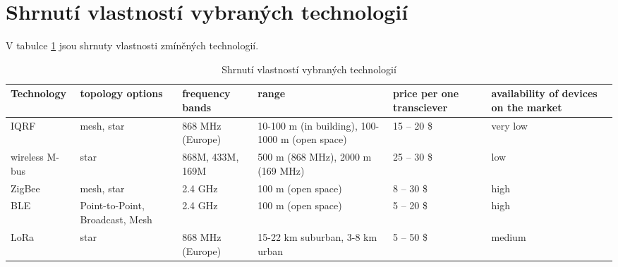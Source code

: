 

\section{Shrnutí vlastností vybraných technologií}
V tabulce \ref{tab:shrnutiTechnologii} jsou shrnuty vlastnosti zmíněných technologií.   


\begin{table}[]
  \begin{tabular}{|p{1.5cm}||p{2cm}|p{2cm}|p{2cm}|p{2cm}|p{2cm}|}
  \hline
  Technology    & topology options                & frequency bands  & range                                           & price per one transciever & availability of devices on the market \\ \hline \hline
  IQRF           & mesh, star                      & 868 MHz (Europe) & 10-100 m (in building), 100-1000 m (open space) & 15 – 20 \$                & very low                              \\ \hline
  wireless M-bus & star                            & 868M, 433M, 169M & 500 m (868 MHz), 2000 m (169 MHz)               & 25 – 30 \$                & low                                   \\ \hline
  ZigBee         & mesh, star                      & 2.4 GHz          & 100 m (open space)                              & 8 – 30 \$                 & high                                  \\ \hline
  BLE            & Point-to-Point, Broadcast, Mesh & 2.4 GHz          & 100 m (open space)                              & 5 – 20 \$                 & high                                  \\ \hline
  LoRa           & star                            & 868 MHz (Europe) & 15-22 km suburban, 3-8 km urban                 & 5 – 50 \$                 & medium                                \\ \hline
  \end{tabular}
  \caption{Shrnutí vlastností vybraných technologií}
  \label{tab:shrnutiTechnologii}
\end{table}


